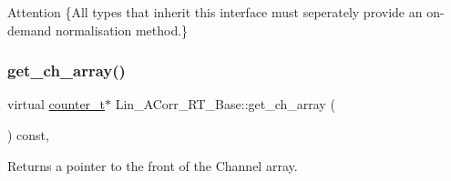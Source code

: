 \begin{DoxyAttention}{Attention}
\{All types that inherit this interface must seperately provide an on-\/demand normalisation method.\} 
\end{DoxyAttention}
\mbox{\label{group__Lin__ACorr__Base__Out_gafb6585805776a54d5e4f120cfd1fea9e}} 
\subsubsection{\texorpdfstring{get\+\_\+ch\+\_\+array()}{get\_ch\_array()}}
{\footnotesize\ttfamily virtual \hyperlink{types_8hpp_a22f279793847eba127de149437848c48}{counter\+\_\+t}$\ast$ Lin\+\_\+\+A\+Corr\+\_\+\+R\+T\+\_\+\+Base\+::get\+\_\+ch\+\_\+array (\begin{DoxyParamCaption}{ }\end{DoxyParamCaption}) const\hspace{0.3cm}{\ttfamily [inline]}, {}}

Returns a pointer to the front of the Channel array. 